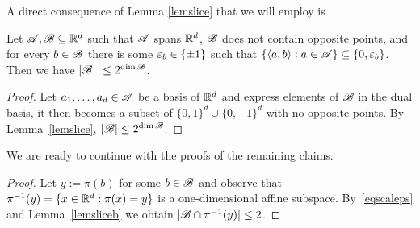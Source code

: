 \noindent A direct consequence of Lemma \ref{lemslice} that we will employ is

\begin{lemma}
    \label{lemsliceb}
    Let ${\mathscr{A}},{\mathscr{B}} \subseteq {\mathbb{R}}^d$ such that ${\mathscr{A}}$ spans ${\mathbb{R}}^d$, ${\mathscr{B}}$ does not contain opposite points, and for every $b \in {\mathscr{B}}$ there is some ${\varepsilon}_b \in \{ \pm 1\}$ such that $\{\langle a,b\rangle : a \in {\mathscr{A}}\} \subseteq \{0,{\varepsilon}_b\}$.
    Then we have $|\bb| \le 2^{\dim \bb}$.
\end{lemma}
\begin{proof}
    Let $a_1,\dots,a_d \in {\mathscr{A}}$ be a basis of ${\mathbb{R}}^d$ and express elements of ${\mathscr{B}}$ in the dual basis, it then becomes a subset of $\{0,1\}^d \cup \{0,-1\}^d$ with no opposite points. By Lemma~\ref{lemslice}, $|\bb| \le 2^{\dim \bb}$.
\end{proof}

We are ready to continue with the proofs of the remaining claims.

\claimpreimagespi*
\begin{proof}
    Let $y := \pi(b)$ for some $b \in {\mathscr{B}}$ and observe that $\pi^{-1}(y) = \{x \in {\mathbb{R}}^d : \pi(x) = y\}$ is a one-dimensional affine subspace.
    By~\eqref{eqscaleps} and Lemma~\ref{lemsliceb} we obtain $|{\mathscr{B}} \cap \pi^{-1}(y)| \le 2$.
\end{proof}

